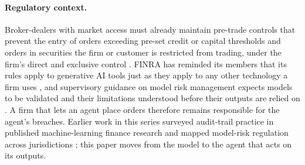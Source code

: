 \paragraph{Regulatory context.} Broker-dealers with market access must already
maintain pre-trade controls that prevent the entry of orders exceeding pre-set
credit or capital thresholds and orders in securities the firm or customer is
restricted from trading, under the firm's direct and exclusive control
\citep{SEC2010MarketAccess}. FINRA has reminded its members that its rules apply
to generative AI tools just as they apply to any other technology a firm uses
\citep{FINRA2024RN2409}, and supervisory guidance on model risk management
expects models to be validated and their limitations understood before their
outputs are relied on \citep{Fed2011SR117}. A firm that lets an agent place
orders therefore remains responsible for the agent's breaches. Earlier work in
this series surveyed audit-trail practice in published machine-learning finance
research \citep{Khan2026AuditTrails} and mapped model-risk regulation across
jurisdictions \citep{Khan2026Crosswalk}; this paper moves from the model to the
agent that acts on its outputs.
